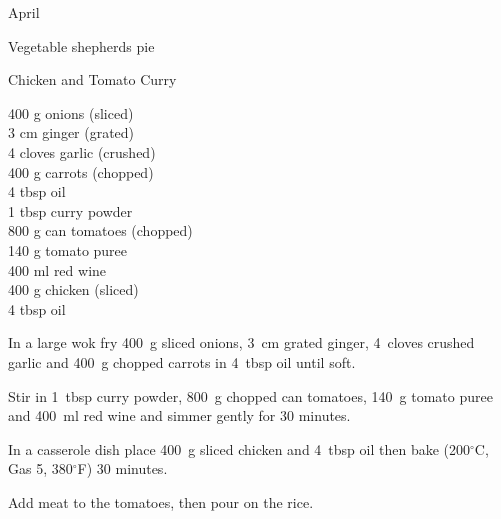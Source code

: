 \begin{menu}{April}
\begin{recipe}{2}{Vegetable shepherds pie}
\begin{instructions}
    \end{instructions}
    \end{recipe}%
  
    \begin{recipe}{2}{Chicken and Tomato Curry}%
    
		\begin{ingredients}
		400 g onions (sliced) \\
	3 cm ginger (grated) \\
	4 cloves garlic (crushed) \\
	400 g carrots (chopped) \\
	4 tbsp oil  \\
	1 tbsp curry powder  \\
	800 g can tomatoes (chopped) \\
	140 g tomato puree  \\
	400 ml red wine  \\
	400 g chicken (sliced) \\
	4 tbsp oil  \\
	
		\end{ingredients}
	
    \begin{instructions}
    \item 
        In a large wok fry
        400~g sliced onions,
        3~cm grated ginger,
        4~cloves crushed garlic
        and
        400~g chopped carrots
        in
        4~tbsp  oil
        until soft.
      \item 
        Stir in
        1~tbsp  curry powder,
        800~g chopped can tomatoes,
        140~g  tomato puree
        and
        400~ml  red wine
        and simmer gently for 30 minutes.
      \item 
        In a casserole dish place
        400~g sliced chicken
        and
        4~tbsp  oil
        then bake 
      (200$^{\circ}$C, Gas 5, 380$^{\circ}$F)
     30 minutes.
      \item \item 
        Add meat to the tomatoes, then pour on the rice.
      
    \end{instructions}
    \end{recipe}%
  
    \clearpage
    \end{menu}
	
